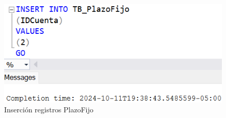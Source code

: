 \begin{figure}[H]
  \centering
  \includegraphics[scale = 0.5]{Imagenes/SQL/4.Insertar_registros/insertar_tb_plazofijo.png}
  \caption{Inserción registros PlazoFijo}
\end{figure}